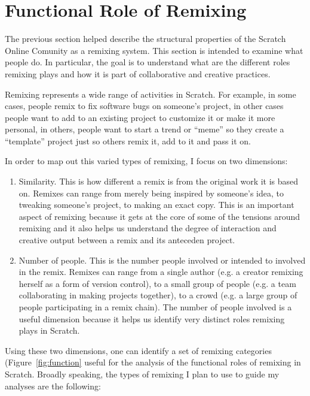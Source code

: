 \section{Functional Role of Remixing}

The previous section helped describe the structural properties of the Scratch Online Comunity as a remixing system.
This section is intended to examine what people do.
In particular, the goal is to understand what are the different roles remixing plays and how it is part of collaborative and creative practices.

Remixing represents a wide range of activities in Scratch.
For example, in some cases, people remix to fix software bugs on someone's project, in other cases people want to add to an existing project to customize it or make it more personal, in others, people want to start a trend or ``meme'' so they create a ``template'' project just so others remix it, add to it and pass it on.

In order to map out this varied types of remixing, I focus on two dimensions:
\begin{enumerate}
\item{Similarity}. This is how different a remix is from the original work it is based on. 
Remixes can range from merely being inspired by someone's idea, to tweaking someone's project, to making an exact copy.
This is an important aspect of remixing because it gets at the core of some of the tensions around remixing and it also helps us understand the degree of interaction and creative output between a remix and its anteceden project.
\item{Number of people}. This is the number people involved or intended to involved in the remix.
Remixes can range from a single author (e.g. a creator remixing herself as a form of version control), to a small group of people (e.g. a team collaborating in making projects together), to a crowd (e.g. a large group of people participating in a remix chain).
The number of people involved is a useful dimension because it helps us identify very distinct roles remixing plays in Scratch.
\end{enumerate}

Using these two dimensions, one can identify a set of remixing categories (Figure~\ref{fig:function} useful for the analysis of the functional roles of remixing in Scratch.
Broadly speaking, the types of remixing I plan to use to guide my analyses are the following:

